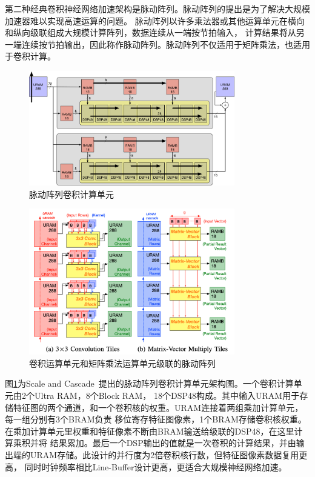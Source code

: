第二种经典卷积神经网络加速架构是脉动阵列。脉动阵列的提出是为了解决大规模加速器难以实现高速运算的问题。
脉动阵列以许多乘法器或其他运算单元在横向和纵向级联组成大规模计算阵列，数据连续从一端按节拍输入，
计算结果将从另一端连续按节拍输出，因此称作脉动阵列。脉动阵列不仅适用于矩阵乘法，也适用于卷积计算。

\begin{figure}[h]
	\centering
	\includegraphics[width=0.8\textwidth]{figure/array}
	\caption{脉动阵列卷积计算单元~\cite{nachiket_stc_fpl2019}} 
	\label{fig:sys}
\end{figure}


\begin{figure}[h]
	\centering
	\includegraphics[width=0.8\textwidth]{figure/cascade}
	\caption{卷积运算单元和矩阵乘法运算单元级联的脉动阵列~\cite{nachiket_stc_fpl2019}} 
	\label{fig:cas}
\end{figure}

图\ref{fig:sys}为Scale and Cascade~\cite{nachiket_stc_fpl2019}提出的脉动阵列卷积计算单元架构图。一个卷积计算单元由2个Ultra RAM，8个Block RAM，
18个DSP48构成。其中输入URAM用于存储特征图的两个通道，和一个卷积核的权重。URAM连接着两组乘加计算单元，每一组分别有3个BRAM负责
移位寄存特征图像素，1个BRAM存储卷积核权重。在乘加计算单元里权重和特征像素不断由BRAM输送给级联的DSP48，在这里计算乘积并将
结果累加。最后一个DSP输出的值就是一次卷积的计算结果，并由输出端的URAM存储。此设计的并行度为2倍卷积核行数，但特征图像素数据复用更高，
同时时钟频率相比Line-Buffer设计更高，更适合大规模神经网络加速。

